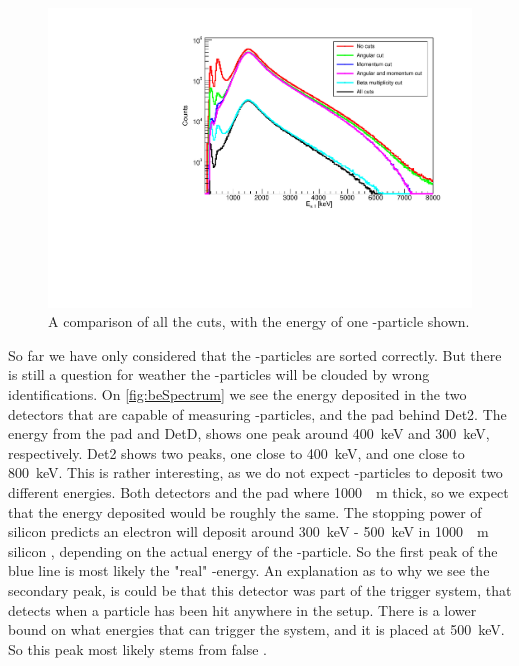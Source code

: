 \begin{figure}[h]
	\centering
	\includegraphics[width=\linewidth]{../figures/cutCompare.pdf}
	\caption{A comparison of all the cuts, with the energy of one \al-particle shown. }
	\label{fig:allCutsCompare}
\end{figure}

So far we have only considered that the \al-particles are sorted correctly. But there is still a question for weather the \be-particles will be clouded by wrong identifications. 
On \cref{fig:beSpectrum} we see the energy deposited in the two detectors that are capable of measuring \be-particles, and the pad behind Det2.
The energy from the pad and DetD, shows one peak around \SI{400}{keV} and \SI{300}{keV}, respectively. 
Det2 shows two peaks, one close to \SI{400}{keV}, and one close to \SI{800}{keV}. This is rather interesting, as we do not expect \be-particles to deposit two different energies. Both detectors and the pad where \SI{1000}{\mu m} thick, so we expect that the energy deposited would be roughly the same. The stopping power of silicon predicts an electron will deposit around \SI{300}{keV} - \SI{500}{keV} in \SI{1000}{\mu m} silicon \cite{NIST_ASD}, depending on the actual energy of the \be-particle. So the first peak of the blue line is most likely the "real" \be-energy. 
An explanation as to why we see the secondary peak, is could be that this detector was part of the trigger system, that detects when a particle has been hit anywhere in the setup. There is a lower bound on what energies that can trigger the system, and it is placed at \SI{500}{keV}. 
So this peak most likely stems from false .

